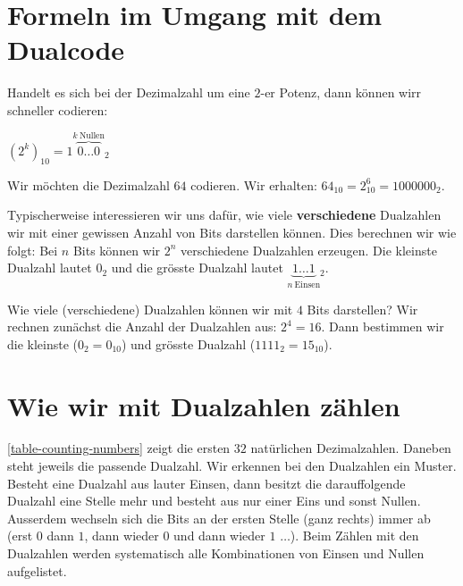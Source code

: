 \section{Formeln im Umgang mit dem Dualcode}

Handelt es sich bei der Dezimalzahl um eine $2$-er Potenz, dann können wirr schneller codieren:

\begin{center}
$(2^k)_{10}=1\overbrace{0\dots0}^{k~\textrm{Nullen}}$$_2$
\end{center}

\begin{example}

Wir möchten die Dezimalzahl $64$ codieren. Wir erhalten: $64_{10} = 2^6_{10} = 1000000_2$.

\end{example}

Typischerweise interessieren wir uns dafür, wie viele \textbf{verschiedene} Dualzahlen wir mit einer gewissen Anzahl von Bits darstellen können. Dies berechnen wir wie folgt: Bei $n$ Bits können wir $2^n$ verschiedene Dualzahlen erzeugen. Die kleinste Dualzahl lautet $0_2$ und die grösste Dualzahl lautet $\underbrace{1\dots1}_{n~\textrm{Einsen}}$$_2$.

\begin{example}
Wie viele (verschiedene) Dualzahlen können wir mit $4$ Bits darstellen? Wir rechnen zunächst die Anzahl der Dualzahlen aus: $2^4 = 16$. Dann bestimmen wir die kleinste ($0_2 = 0_{10}$) und grösste Dualzahl ($1111_2 = 15_{10}$).
\end{example}

\section{Wie wir mit Dualzahlen zählen}

\autoref{table-counting-numbers} zeigt die ersten $32$ natürlichen Dezimalzahlen. Daneben steht jeweils die passende Dualzahl. Wir erkennen bei den Dualzahlen ein Muster. Besteht eine Dualzahl aus lauter Einsen, dann besitzt die darauffolgende Dualzahl eine Stelle mehr und besteht aus nur einer Eins und sonst Nullen. Ausserdem wechseln sich die Bits an der ersten Stelle (ganz rechts) immer ab (erst $0$ dann $1$, dann wieder $0$ und dann wieder $1$ $\dots$). Beim Zählen mit den Dualzahlen werden systematisch alle Kombinationen von Einsen und Nullen aufgelistet.

